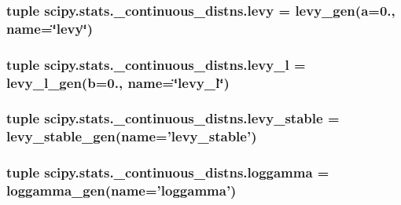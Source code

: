 \subsubsection[{levy}]{\setlength{\rightskip}{0pt plus 5cm}tuple scipy.\+stats.\+\_\+continuous\+\_\+distns.\+levy = {\bf levy\+\_\+gen}({\bf a}=0., name=\char`\"{}levy\char`\"{})}\label{namespacescipy_1_1stats_1_1__continuous__distns_a6260d6908a78dd7f1b8c6521e49e1d78}
\hypertarget{namespacescipy_1_1stats_1_1__continuous__distns_a667c28e809b6b959ef734949a75645a1}{}
\subsubsection[{levy\+\_\+l}]{\setlength{\rightskip}{0pt plus 5cm}tuple scipy.\+stats.\+\_\+continuous\+\_\+distns.\+levy\+\_\+l = {\bf levy\+\_\+l\+\_\+gen}({\bf b}=0., name=\char`\"{}levy\+\_\+l\char`\"{})}\label{namespacescipy_1_1stats_1_1__continuous__distns_a667c28e809b6b959ef734949a75645a1}
\hypertarget{namespacescipy_1_1stats_1_1__continuous__distns_a32be6a3feb387220b61bd807a0d02847}{}
\subsubsection[{levy\+\_\+stable}]{\setlength{\rightskip}{0pt plus 5cm}tuple scipy.\+stats.\+\_\+continuous\+\_\+distns.\+levy\+\_\+stable = {\bf levy\+\_\+stable\+\_\+gen}(name='levy\+\_\+stable')}\label{namespacescipy_1_1stats_1_1__continuous__distns_a32be6a3feb387220b61bd807a0d02847}
\hypertarget{namespacescipy_1_1stats_1_1__continuous__distns_a80d4b675ce61a8bd94cf5bf73536ca91}{}
\subsubsection[{loggamma}]{\setlength{\rightskip}{0pt plus 5cm}tuple scipy.\+stats.\+\_\+continuous\+\_\+distns.\+loggamma = {\bf loggamma\+\_\+gen}(name='loggamma')}\label{namespacescipy_1_1stats_1_1__continuous__distns_a80d4b675ce61a8bd94cf5bf73536ca91}
\hypertarget{namespacescipy_1_1stats_1_1__continuous__distns_a4a53aede6085bfe7c84a33918ac592ac}{}
